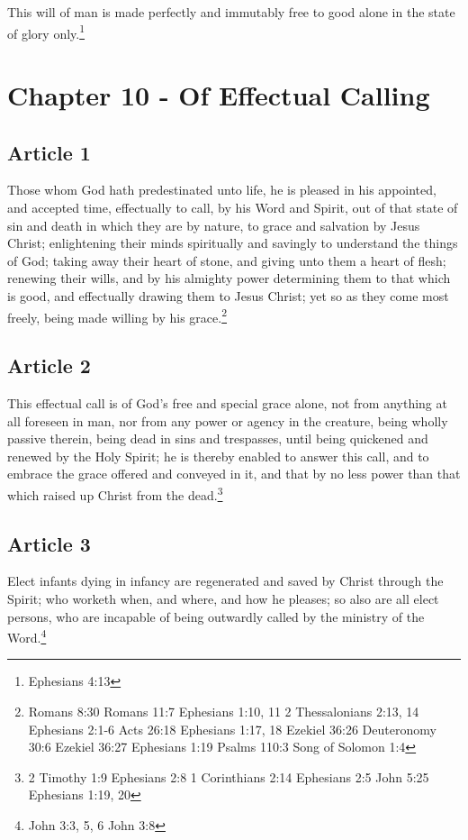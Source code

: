 \documentclass[12pt,letterpaper]{book}
\begin{document}
This will of man is made perfectly and immutably free to good alone in the state of glory only.\footnote{Ephesians 4:13}

\chapter{Chapter 10 - Of Effectual Calling}
\section{Article 1}

Those whom God hath predestinated unto life, he is pleased in his appointed, and accepted time, effectually to call, by his Word and Spirit, out of that state of sin and death in which they are by nature, to grace and salvation by Jesus Christ; enlightening their minds spiritually and savingly to understand the things of God; taking away their heart of stone, and giving unto them a heart of flesh; renewing their wills, and by his almighty power determining them to that which is good, and effectually drawing them to Jesus Christ; yet so as they come most freely, being made willing by his grace.\footnote{Romans 8:30 Romans 11:7 Ephesians 1:10, 11 2 Thessalonians 2:13, 14 Ephesians 2:1-6 Acts 26:18 Ephesians 1:17, 18 Ezekiel 36:26 Deuteronomy 30:6 Ezekiel 36:27 Ephesians 1:19 Psalms 110:3 Song of Solomon 1:4}

\section{Article 2}

This effectual call is of God's free and special grace alone, not from anything at all foreseen in man, nor from any power or agency in the creature, being wholly passive therein, being dead in sins and trespasses, until being quickened and renewed by the Holy Spirit; he is thereby enabled to answer this call, and to embrace the grace offered and conveyed in it, and that by no less power than that which raised up Christ from the dead.\footnote{2 Timothy 1:9 Ephesians 2:8 1 Corinthians 2:14 Ephesians 2:5 John 5:25 Ephesians 1:19, 20}

\section{Article 3}

Elect infants dying in infancy are regenerated and saved by Christ through the Spirit; who worketh when, and where, and how he pleases; so also are all elect persons, who are incapable of being outwardly called by the ministry of the Word.\footnote{John 3:3, 5, 6 John 3:8}
\end{document}
